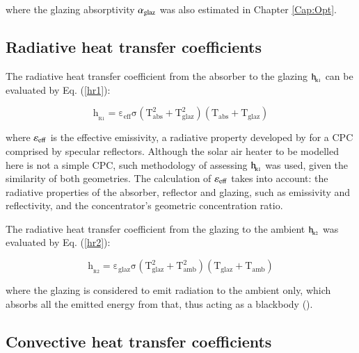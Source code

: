 \noindent where the glazing absorptivity $\alpha_{\rm{glaz}}$ was also estimated in Chapter \ref{Cap:Opt}.

\subsection{Radiative heat transfer coefficients}

The radiative heat transfer coefficient from the absorber to the glazing $\rm{h_{\!_{R1}}}$ can be evaluated by Eq. (\ref{hr1}):

\vspace{-0.75cm}
\begin{equation}
\mathrm{{h_{\!_{R1}}} = {\varepsilon _{eff}}\sigma \left( {T_{abs}^2 + T_{glaz}^2} \right)\left( {{T_{abs}} + {T_{glaz}}} \right)}
\label{hr1}
\end{equation}

\noindent where $\rm{\varepsilon_{eff}}$ is the effective emissivity, a radiative property developed by \citet{Rabl1976} for a CPC comprised by specular reflectors. Although the solar air heater to be modelled here is not a simple CPC, such methodology of assessing $\rm{h_{\!_{R1}}}$ was used, given the similarity of both geometries. The calculation of $\rm{\varepsilon_{eff}}$ takes into account: the radiative properties of the absorber, reflector and glazing, such as emissivity and reflectivity, and the concentrator's geometric concentration ratio. 

The radiative heat transfer coefficient from the glazing to the ambient $\rm{h_{\!_{R2}}}$ was evaluated by Eq. (\ref{hr2}):

\vspace{-0.75cm}
\begin{equation}
\mathrm{{h_{\!_{R2}}} = {\varepsilon _{glaz}}\sigma \left( {T_{glaz}^2 + T_{amb}^2} \right)\left( {{T_{glaz}} + {T_{amb}}} \right)}
\label{hr2}
\end{equation}

\noindent where the glazing is considered to emit radiation to the ambient only, which absorbs all the emitted energy from that, thus acting as a blackbody (\cite{Duffie2013}).

\subsection{Convective heat transfer coefficients}

